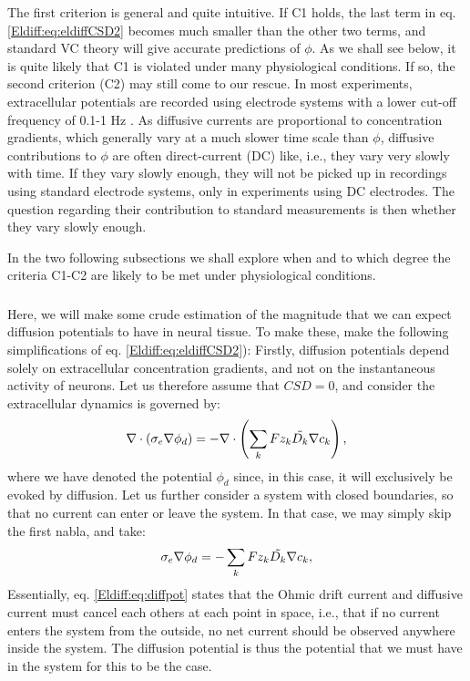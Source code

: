 The first criterion is general and quite intuitive. If C1 holds, the last term in eq. \ref{Eldiff:eq:eldiffCSD2} becomes much smaller than the other two terms, and standard VC theory will give accurate predictions of $\phi$. As we shall see below, it is quite likely that C1 is violated under many physiological conditions. If so, the second criterion (C2) may still come to our rescue. In most experiments, extracellular potentials are recorded using electrode systems with a lower cut-off frequency of 0.1-1 Hz \citep{Einevoll2007}. As diffusive currents are proportional to concentration gradients, which generally vary at a much slower time scale than $\phi$, diffusive contributions to $\phi$ are often direct-current (DC) like, i.e., they vary very slowly with time. If they vary slowly enough, they will not be picked up in recordings using standard electrode systems, only in experiments using DC electrodes. The question regarding their contribution to standard measurements is then whether they vary slowly enough. 

In the two following subsections we shall explore when and to which degree the criteria C1-C2 are likely to be met under physiological conditions.

\subsubsection{}
Here, we will make some crude estimation of the magnitude that we can expect diffusion potentials to have in neural tissue. To make these, make the following simplifications of eq. \ref{Eldiff:eq:eldiffCSD2}): Firstly, diffusion potentials depend solely on extracellular concentration gradients, and not on the instantaneous activity of neurons. Let us therefore assume that $CSD = 0$, and consider the extracellular dynamics is governed by:
\begin{equation}
\nabla \cdot (\sigma_e\nabla\phi_d) = - \nabla \cdot \left (\sum_k{F z_k \tilde{D_k}{\bf \nabla} c_{k}} \right), 
\label{Eldiff:eq:eldiffCSD3}
\end{equation}
where we have denoted the potential $\phi_d$ since, in this case, it will exclusively be evoked by diffusion. Let us further consider a system with closed boundaries, so that no current can enter or leave the system. In that case, we may simply skip the first nabla, and take:
\begin{equation}
\sigma_e\nabla\phi_d = -\sum_k{F z_k \tilde{D_k}{\bf \nabla} c_{k}}, 
\label{Eldiff:eq:diffpot}
\end{equation}
Essentially, eq. \ref{Eldiff:eq:diffpot} states that the Ohmic drift current and diffusive current must cancel each others at each point in space, i.e., that if no current enters the system from the outside, no net current should be observed anywhere inside the system. The diffusion potential is thus the potential that we must have in the system for this to be the case. 

